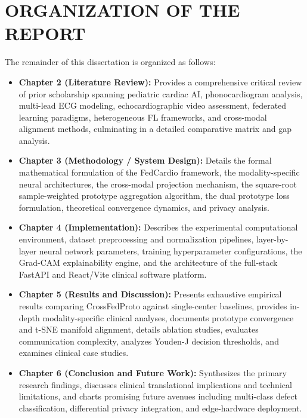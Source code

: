 \documentclass[12pt,a4paper]{amritareport}
\begin{document}
\section{ORGANIZATION OF THE REPORT}

The remainder of this dissertation is organized as follows:
\begin{itemize}
	\item \textbf{Chapter 2 (Literature Review):} Provides a comprehensive critical review of prior scholarship spanning pediatric cardiac AI, phonocardiogram analysis, multi-lead ECG modeling, echocardiographic video assessment, federated learning paradigms, heterogeneous FL frameworks, and cross-modal alignment methods, culminating in a detailed comparative matrix and gap analysis.
	\item \textbf{Chapter 3 (Methodology / System Design):} Details the formal mathematical formulation of the FedCardio framework, the modality-specific neural architectures, the cross-modal projection mechanism, the square-root sample-weighted prototype aggregation algorithm, the dual prototype loss formulation, theoretical convergence dynamics, and privacy analysis.
	\item \textbf{Chapter 4 (Implementation):} Describes the experimental computational environment, dataset preprocessing and normalization pipelines, layer-by-layer neural network parameters, training hyperparameter configurations, the Grad-CAM explainability engine, and the architecture of the full-stack FastAPI and React/Vite clinical software platform.
	\item \textbf{Chapter 5 (Results and Discussion):} Presents exhaustive empirical results comparing CrossFedProto against single-center baselines, provides in-depth modality-specific clinical analyses, documents prototype convergence and t-SNE manifold alignment, details ablation studies, evaluates communication complexity, analyzes Youden-J decision thresholds, and examines clinical case studies.
	\item \textbf{Chapter 6 (Conclusion and Future Work):} Synthesizes the primary research findings, discusses clinical translational implications and technical limitations, and charts promising future avenues including multi-class defect classification, differential privacy integration, and edge-hardware deployment.
\end{itemize}


\end{document}
